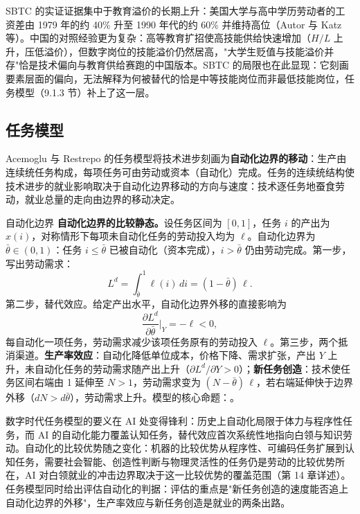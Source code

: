SBTC 的实证证据集中于教育溢价的长期上升：美国大学与高中学历劳动者的工资差由 1979 年的约 40\% 升至 1990 年代的约 60\% 并维持高位（Autor 与 Katz 等）。中国的对照经验更为复杂：高等教育扩招使高技能供给快速增加（$H/L$ 上升，压低溢价），但数字岗位的技能溢价仍然居高，"大学生贬值与技能溢价并存"恰是技术偏向与教育供给赛跑的中国版本。SBTC 的局限也在此显现：它刻画要素层面的偏向，无法解释为何被替代的恰是中等技能岗位而非最低技能岗位，任务模型（9.1.3 节）补上了这一层。

\subsection{任务模型}

Acemoglu 与 Restrepo 的任务模型将技术进步刻画为\textbf{自动化边界的移动}：生产由连续统任务构成，每项任务可由劳动或资本（自动化）完成。任务的连续统结构使技术进步的就业影响取决于自动化边界移动的方向与速度：技术逐任务地蚕食劳动，就业总量的走向由边界的移动决定。

\begin{derivation}{自动化边界}{}
\textbf{自动化边界的比较静态。}设任务区间为 $[0,1]$，任务 $i$ 的产出为 $x(i)$，对称情形下每项未自动化任务的劳动投入均为 $\ell$。自动化边界为 $\bar\theta \in (0,1)$：任务 $i \leq \bar\theta$ 已被自动化（资本完成），$i > \bar\theta$ 仍由劳动完成。第一步，写出劳动需求：
\[
L^d = \int_{\bar\theta}^{1} \ell(i)\, di = (1 - \bar\theta)\, \ell.
\]
第二步，替代效应。给定产出水平，自动化边界外移的直接影响为
\[
\frac{\partial L^d}{\partial \bar\theta}\Big|_{Y} = -\ell < 0,
\]
每自动化一项任务，劳动需求减少该项任务原有的劳动投入 $\ell$。第三步，两个抵消渠道。\textbf{生产率效应}：自动化降低单位成本，价格下降、需求扩张，产出 $Y$ 上升，未自动化任务的劳动需求随产出上升（$\partial L^d/\partial Y > 0$）；\textbf{新任务创造}：技术使任务区间右端由 1 延伸至 $N > 1$，劳动需求变为 $(N - \bar\theta)\,\ell$，若右端延伸快于边界外移（$dN > d\bar\theta$），劳动需求上升。模型的核心命题：。
\end{derivation}

数字时代任务模型的要义在 AI 处变得锋利：历史上自动化局限于体力与程序性任务，而 AI 的自动化能力覆盖认知任务，替代效应首次系统性地指向白领与知识劳动。自动化的比较优势随之变化：机器的比较优势从程序性、可编码任务扩展到认知任务，需要社会智能、创造性判断与物理灵活性的任务仍是劳动的比较优势所在，AI 对白领就业的冲击边界取决于这一比较优势的覆盖范围（第 14 章详述）。任务模型同时给出评估自动化的判据：评估的重点是"新任务创造的速度能否追上自动化边界的外移"，生产率效应与新任务创造是就业的两条出路。


